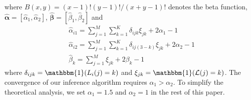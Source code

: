 %
where $B(x,y)=(x-1)!(y-1)!/(x+y-1)!$ denotes the beta function, $\hat{\bm{\alpha}}=[\hat{\alpha}_1,\hat{\alpha}_2]$, $\hat{\bm{\beta}}=[\hat{\beta}_1,\hat{\beta}_2]$ and
\begin{equation*}
\begin{split}
&\hat{\alpha}_{i1}={\sum}_{j=1}^{M}{\sum}_{k=1}^{K}\delta_{ijk}\xi_{jk}+2\alpha_{1}-1\\
&\hat{\alpha}_{i2}={\sum}_{j=1}^{M}{\sum}_{k=1}^{K}\delta_{ij(3-k)}\xi_{jk}+2\alpha_{2}-1\\
&\hat{\beta}_k={\sum}_{j=1}^{M}\xi_{jk}+2\beta_{k}-1
\end{split}
\end{equation*}
where $\delta_{ijk}=\mathbbm{1}(L_i(j)=k)$ and $\xi_{jk}= \mathbbm{1}(\mathcal{L}(j)=k)$. The convergence of our inference algorithm requires $\alpha_1>\alpha_2$.
To simplify the theoretical analysis, we set $\alpha_1=1.5$ and $\alpha_2=1$ in the rest of this paper.
